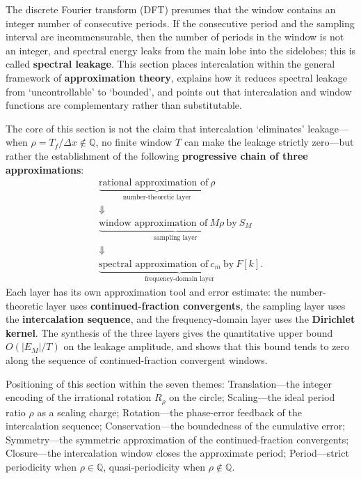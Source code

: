 \begin{remark}\label{rem:intercalation_leakage_positioning}
The discrete Fourier transform (DFT) presumes that the window contains an integer number of consecutive periods. If the consecutive period and the sampling interval are incommensurable, then the number of periods in the window is not an integer, and spectral energy leaks from the main lobe into the sidelobes; this is called \textbf{spectral leakage}. This section places intercalation within the general framework of \textbf{approximation theory}, explains how it reduces spectral leakage from `uncontrollable' to `bounded', and points out that intercalation and window functions are complementary rather than substitutable.

The core of this section is not the claim that intercalation `eliminates' leakage---when $\rho=T_f/\Delta x\notin\mathbb{Q}$, no finite window $T$ can make the leakage strictly zero---but rather the establishment of the following \textbf{progressive chain of three approximations}:
\[
\begin{gathered}
\underbrace{\text{rational approximation of}\ \rho}_{\text{number-theoretic layer}}
\\ \Downarrow \\
\underbrace{\text{window approximation of}\ M\rho\ \text{by}\ S_M}_{\text{sampling layer}}
\\ \Downarrow \\
\underbrace{\text{spectral approximation of}\ c_m\ \text{by}\ F[k]}_{\text{frequency-domain layer}}.
\end{gathered}
\]
Each layer has its own approximation tool and error estimate: the number-theoretic layer uses \textbf{continued-fraction convergents}, the sampling layer uses the \textbf{intercalation sequence}, and the frequency-domain layer uses the \textbf{Dirichlet kernel}. The synthesis of the three layers gives the quantitative upper bound $O(|E_M|/T)$ on the leakage amplitude, and shows that this bound tends to zero along the sequence of continued-fraction convergent windows.

Positioning of this section within the seven themes: Translation---the integer encoding of the irrational rotation $R_\rho$ on the circle; Scaling---the ideal period ratio $\rho$ as a scaling charge; Rotation---the phase-error feedback of the intercalation sequence; Conservation---the boundedness of the cumulative error; Symmetry---the symmetric approximation of the continued-fraction convergents; Closure---the intercalation window closes the approximate period; Period---strict periodicity when $\rho\in\mathbb{Q}$, quasi-periodicity when $\rho\notin\mathbb{Q}$.
\end{remark}

